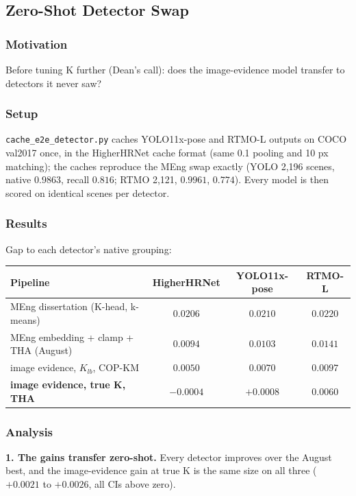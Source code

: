 \subsection{Zero-Shot Detector Swap}

\subsubsection{Motivation}

Before tuning K further (Dean's call): does the image-evidence model transfer to detectors it never saw?

\subsubsection{Setup}

\texttt{cache\_e2e\_detector.py} caches YOLO11x-pose and RTMO-L outputs on COCO val2017 once, in the HigherHRNet cache format (same 0.1 pooling and 10 px matching); the caches reproduce the MEng swap exactly (YOLO 2,196 scenes, native $0.9863$, recall $0.816$; RTMO 2,121, $0.9961$, $0.774$). Every model is then scored on identical scenes per detector.

\subsubsection{Results}

Gap to each detector's native grouping:

\begin{tabular}{lccc}
\hline
\textbf{Pipeline} & \textbf{HigherHRNet} & \textbf{YOLO11x-pose} & \textbf{RTMO-L} \\
\hline
MEng dissertation (K-head, k-means)        & $0.0206$ & $0.0210$ & $0.0220$ \\
MEng embedding + clamp + THA (August)      & $0.0094$ & $0.0103$ & $0.0141$ \\
image evidence, $K_{lb}$, COP-KM           & $0.0050$ & $0.0070$ & $0.0097$ \\
\textbf{image evidence, true K, THA}       & $\mathbf{-0.0004}$ & $\mathbf{+0.0008}$ & $\mathbf{0.0060}$ \\
\hline
\end{tabular}

\subsubsection{Analysis}

\textbf{1. The gains transfer zero-shot.} Every detector improves over the August best, and the image-evidence gain at true K is the same size on all three ($+0.0021$ to $+0.0026$, all CIs above zero).

